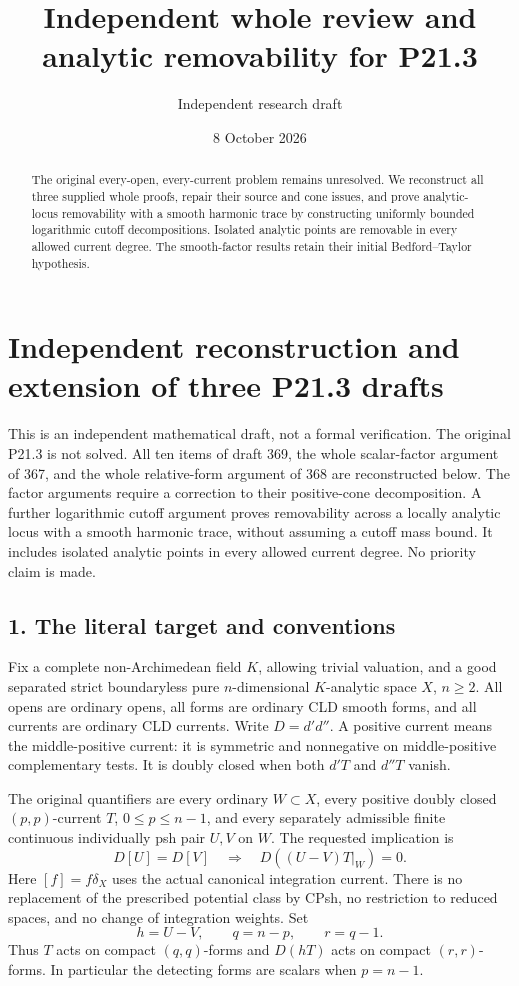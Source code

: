 \documentclass[11pt]{article}
\title{Independent whole review and analytic removability for P21.3}
\author{Independent research draft}
\date{8 October 2026}
\begin{document}
\maketitle
\begin{abstract}
The original every-open, every-current problem remains unresolved. We reconstruct all three supplied whole proofs, repair their source and cone issues, and prove analytic-locus removability with a smooth harmonic trace by constructing uniformly bounded logarithmic cutoff decompositions. Isolated analytic points are removable in every allowed current degree. The smooth-factor results retain their initial Bedford--Taylor hypothesis.
\end{abstract}
\section{Independent reconstruction and extension of three P21.3 drafts}

This is an independent mathematical draft, not a formal verification. The original P21.3 is not solved. All ten items of draft 369, the whole scalar-factor argument of 367, and the whole relative-form argument of 368 are reconstructed below. The factor arguments require a correction to their positive-cone decomposition. A further logarithmic cutoff argument proves removability across a locally analytic locus with a smooth harmonic trace, without assuming a cutoff mass bound. It includes isolated analytic points in every allowed current degree. No priority claim is made.

\subsection{1. The literal target and conventions}

Fix a complete non-Archimedean field \(K\), allowing trivial valuation, and a good separated strict boundaryless pure \(n\)-dimensional \(K\)-analytic space \(X\), \(n\geq2\). All opens are ordinary opens, all forms are ordinary CLD smooth forms, and all currents are ordinary CLD currents. Write \(D=d'd''\). A positive current means the middle-positive current: it is symmetric and nonnegative on middle-positive complementary tests. It is doubly closed when both \(d'T\) and \(d''T\) vanish.

The original quantifiers are every ordinary \(W\subset X\), every positive doubly closed \((p,p)\)-current \(T\), \(0\leq p\leq n-1\), and every separately admissible finite continuous individually psh pair \(U,V\) on \(W\). The requested implication is
\[
 D[U]=D[V]\quad\Longrightarrow\quad D((U-V)T|_W)=0.
\]
Here \([f]=f\delta_X\) uses the actual canonical integration current. There is no replacement of the prescribed potential class by CPsh, no restriction to reduced spaces, and no change of integration weights. Set
\[
 h=U-V,\qquad q=n-p,\qquad r=q-1.
\]
Thus \(T\) acts on compact \((q,q)\)-forms and \(D(hT)\) acts on compact \((r,r)\)-forms. In particular the detecting forms are scalars when \(p=n-1\).
\end{document}
